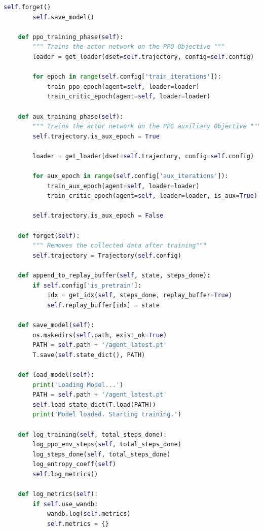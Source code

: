 \documentclass{article}
\begin{document}
\begin{lstlisting}[language=Python]
        self.forget()
        self.save_model()

    def ppo_training_phase(self):
        """ Trains the actor network on the PPO Objective """
        loader = get_loader(dset=self.trajectory, config=self.config)

        for epoch in range(self.config['train_iterations']):
            train_ppo_epoch(agent=self, loader=loader)
            train_critic_epoch(agent=self, loader=loader)

    def aux_training_phase(self):
        """ Trains the actor network on the PPG auxiliary Objective """
        self.trajectory.is_aux_epoch = True

        loader = get_loader(dset=self.trajectory, config=self.config)

        for aux_epoch in range(self.config['aux_iterations']):
            train_aux_epoch(agent=self, loader=loader)
            train_critic_epoch(agent=self, loader=loader, is_aux=True)

        self.trajectory.is_aux_epoch = False

    def forget(self):
        """ Removes the collected data after training"""
        self.trajectory = Trajectory(self.config)

    def append_to_replay_buffer(self, state, steps_done):
        if self.config['is_pretrain']:
            idx = get_idx(self, steps_done, replay_buffer=True)
            self.replay_buffer[idx] = state

    def save_model(self):
        os.makedirs(self.path, exist_ok=True)
        PATH = self.path + '/agent_latest.pt'
        T.save(self.state_dict(), PATH)

    def load_model(self):
        print('Loading Model...')
        PATH = self.path + '/agent_latest.pt'
        self.load_state_dict(T.load(PATH))
        print('Model loaded. Starting training.')

    def log_training(self, total_steps_done):
        log_ppo_env_steps(self, total_steps_done)
        log_steps_done(self, total_steps_done)
        log_entropy_coeff(self)
        self.log_metrics()

    def log_metrics(self):
        if self.use_wandb:
            wandb.log(self.metrics)
            self.metrics = {}
\end{lstlisting}
\end{document}
